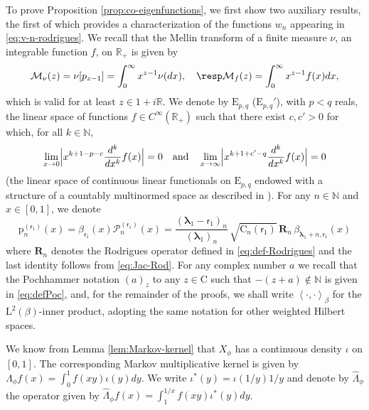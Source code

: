 \documentclass[JEP,XML,SOM,Unicode]{cedram}
\theoremstyle{plain}
\theoremstyle{definition}
\newcommand{\N}{\mathbb{N}}
\newcommand{\R}{\mathbb{R}}
\renewcommand{\P}{\mathcal{P}}
\newcommand{\calM}{\mathcal{M}}
\newcommand{\Rc}{\mathbf{R}}
\newcommand{\C}{{\mathrm{C}}}
\newcommand{\Em}{\mathrm{E}}
\newcommand{\Leb}{\mathrm{L}}
\newcommand{\pab}[1][\alpha,\beta]{\mathrm{p}^{(#1)}}
\newcommand{\lam}{{\bm{\lambda}_1}}
\newcommand{\vat}{{\mathsf{r}_1}}
\newcommand{\gab}[1][\lam,\mo]{{\beta_{#1}}}
\let\mo\mu
\let\bpsi\beta
\begin{document}
To prove Proposition \ref{prop:co-eigenfunctions}, we first show two auxiliary results, the first of which provides
a characterization of the functions $w_n$ appearing in \eqref{eq:v-n-rodrigues}.
We recall that the Mellin transform of a finite measure $\nu$, \resp an integrable function $f$, on $\R_+$ is given by
\begin{equation*}
\calM_{\nu}(z) = \nu[p_{z-1}] = \int_0^\infty x^{z-1}\nu(dx), \quad \resp \calM_{f}(z)=\int_0^\infty x^{z-1}f(x)dx,
\end{equation*}
which is valid for at least $z \in 1+i\R$. We denote by $\Em_{p,q}$ (\resp $\Em_{p,q}'$), with $p < q$ reals, the linear space of functions $f \in C^\infty(\R_+)$ such that there exist $c, c' > 0$ for which, for all $k \in \N$,
\begin{equation*}
\lim_{x\to 0} \Bigl| x^{k+1-p-c} \frac{d^k}{dx^k}f(x)\Bigr| = 0 \quad \text{and} \quad \lim_{x\to \infty} \Bigl| x^{k+1+c'-q} \frac{d^k}{dx^k}f(x)\Bigr| = 0
\end{equation*}
(\resp the linear space of continuous linear functionals on $\Em_{p,q}$ endowed with a structure of a countably multinormed space as described in \cite[p.\,231]{Misra-Lavoine}). For any $n \in \N$ and $x\in [0,1]$, we denote
\begin{equation*}
\pab[\vat]_n(x) = \gab[\vat](x) \P_n^{(\vat)}(x) = \frac{(\lam-\vat)_n}{(\lam)_n}\, \sqrt{\C_n(\vat)}\, \Rc_{n}\, \gab[\lam+n,\vat](x)
\end{equation*}
where $\Rc_{n}$ denotes the Rodrigues operator defined in \eqref{eq:def-Rodrigues} and the last identity follows from \eqref{eq:Jac-Rod}. For any complex number $a$ we recall that the Pochhammer notation $(a)_z$ to any $z \in \C$ such that $-(z+a) \notin \N$ is given in \eqref{eq:defPoc}, and, for the remainder of the proofs, we shall write $\left\langle \cdot{,}\cdot \right\rangle_{\bpsi}$ for the $\Leb^2(\bpsi)$-inner product, adopting the same notation for other weighted Hilbert spaces.

We know from Lemma \ref{lem:Markov-kernel} that $X_{\phi}$ has a continuous density $\iota$ on $[0,1]$.
The corresponding Markov multiplicative kernel is given by $\Lambda_{\phi} f(x) = \int_0^1 f(xy) \iota(y)dy$.
We write $\iota^*(y)=\iota(1/y)1/y$ and denote by $\hat{\Lambda}_{\phi}$ the operator given by
$\widehat{\Lambda}_{\phi} f(x) = \int_1^{1/x}f(xy)\iota^*(y)dy$.
\end{document}
